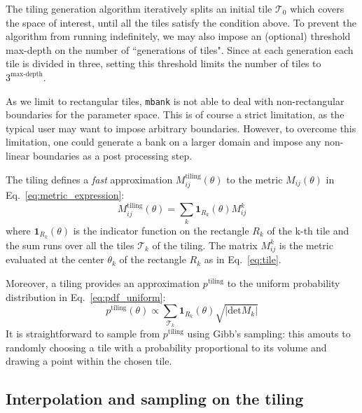 \documentclass[twocolumn,showpacs,preprintnumbers,nofootinbib,prd,
superscriptaddress,10pt]{revtex4-2}
\begin{document}
The tiling generation algorithm iteratively splits an initial tile $\mathcal{T}_{0}$ which covers the space of interest, until all the tiles satisfy the condition above.
To prevent the algorithm from running indefinitely, we may also impose an (optional) threshold max-depth on the number of ``generations of tiles". Since at each generation each tile is divided in three, setting this threshold limits the number of tiles to $3^{\textrm{max-depth}}$.

As we limit to rectangular tiles, \texttt{mbank} is not able to deal with non-rectangular boundaries for the parameter space. This is of course a strict limitation, as the typical user may want to impose arbitrary boundaries. However, to overcome this limitation, one could generate a bank on a larger domain and impose any non-linear boundaries as a post processing step.

The tiling defines a {\it fast} approximation $M^{\text{tiling}}_{ij}(\theta)$ to the metric $M_{ij}(\theta)$ in Eq.~\eqref{eq:metric_expression}:
\begin{equation}\label{eq:metric_tiling}
	M^\text{tiling}_{ij}(\theta) = \sum_{k} \mathbf{1}_{R_k}(\theta) M^{k}_{ij}
\end{equation}
where $\mathbf{1}_{R_k}(\theta)$ is the indicator function on the rectangle $R_k$ of the k-th tile and the sum runs over all the tiles $\mathcal{T}_k$ of the tiling. The matrix $M^{k}_{ij}$ is the metric evaluated at the center $\theta_k$ of the rectangle $R_k$ as in Eq.~\eqref{eq:tile}.

Moreover, a tiling provides an approximation $p^{\text{tiling}}$ to the uniform probability distribution in Eq.~\eqref{eq:pdf_uniform}:
\begin{equation}\label{eq:tiling_pdf}
	p^{\text{tiling}}(\theta) \propto \sum_{\mathcal{T}_k} \mathbf{1}_{R_k}(\theta) \sqrt{|\text{det} M_k|}
\end{equation}
It is straightforward to sample from $p^{\text{tiling}}$ using Gibb's sampling: this amouts to randomly choosing a tile with a probability proportional to its volume and drawing a point within the chosen tile.

\subsection{Interpolation and sampling on the tiling} \label{sec:normalizing_flow}
\end{document}

